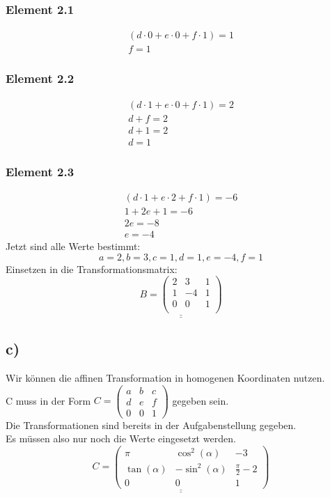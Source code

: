 \documentclass{article}
\begin{document}
\subsubsection*{Element 2.1}

\begin{align*}
    (d \cdot 0 + e \cdot 0 + f \cdot 1) = 1 \\
    f = 1
\end{align*}

\subsubsection*{Element 2.2}

\begin{align*}
    (d \cdot 1 + e \cdot 0 + f \cdot 1) = 2 \\
    d + f = 2 \\
    d + 1 = 2 \\
    d = 1
\end{align*}

\subsubsection*{Element 2.3}

\begin{align*}
    (d \cdot 1 + e \cdot 2 + f \cdot 1) = -6 \\
    1 + 2e + 1 = -6 \\
    2e = -8 \\
    e = -4
\end{align*}
Jetzt sind alle Werte bestimmt:
$$
a = 2, b = 3, c = 1, d = 1, e = -4, f = 1
$$
Einsetzen in die Transformationsmatrix:
$$
\underline{\underline{
B =
\begin{pmatrix}
    2 & 3 & 1 \\
    1 & -4 & 1 \\
    0 & 0 & 1 \\
\end{pmatrix}
}}
$$
\subsection*{c)}
Wir können die affinen Transformation in homogenen Koordinaten nutzen. \\
C muss in der Form $C = \begin{pmatrix} a & b & c \\ d & e & f \\ 0 & 0 & 1 \end{pmatrix}$ gegeben sein. \\
Die Transformationen sind bereits in der Aufgabenstellung gegeben.\\
Es müssen also nur noch die Werte eingesetzt werden.\\
$$
\underline{\underline{C = \begin{pmatrix} \pi & \cos ^2(\alpha) & -3 \\ \tan(\alpha) & - \sin ^2(\alpha) & \frac{\pi}{2}-2 \\ 0 & 0 & 1 \end{pmatrix}}}
$$
\end{document}
